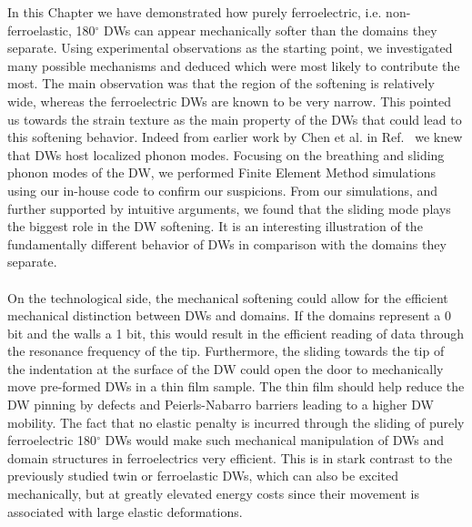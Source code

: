 In this Chapter we have demonstrated how purely ferroelectric, i.e. non-ferroelastic, 180$^\circ$ DWs can appear mechanically softer than the domains they separate.
Using experimental observations as the starting point, we investigated many possible mechanisms and deduced which were most likely to contribute the most.
The main observation was that the region of the softening is relatively wide, whereas the ferroelectric DWs are known to be very narrow.
This pointed us towards the strain texture as the main property of the DWs that could lead to this softening behavior.
Indeed from earlier work by Chen et al. in Ref.~\cite{Chen2020} we knew that DWs host localized phonon modes.
Focusing on the breathing and sliding phonon modes of the DW, we performed Finite Element Method simulations using our in-house code to confirm our suspicions.
From our simulations, and further supported by intuitive arguments, we found that the sliding mode plays the biggest role in the DW softening.
It is an interesting illustration of the fundamentally different behavior of DWs in comparison with the domains they separate.
\\\\
On the technological side, the mechanical softening could allow for the efficient mechanical distinction between DWs and domains. If the domains represent a 0 bit and the walls a 1 bit, this would result in the efficient reading of data through the resonance frequency of the tip.
Furthermore, the sliding towards the tip of the indentation at the surface of the DW could open the door to mechanically move pre-formed DWs in a thin film sample.
The thin film should help reduce the DW pinning by defects and Peierls-Nabarro barriers leading to a higher DW mobility.
The fact that no elastic penalty is incurred through the sliding of purely ferroelectric 180$^\circ$ DWs would make such mechanical manipulation of DWs and domain structures in ferroelectrics very efficient.
This is in stark contrast to the previously studied twin or ferroelastic DWs, which can also be excited mechanically, but at greatly elevated energy costs since their movement is associated with large elastic deformations.
